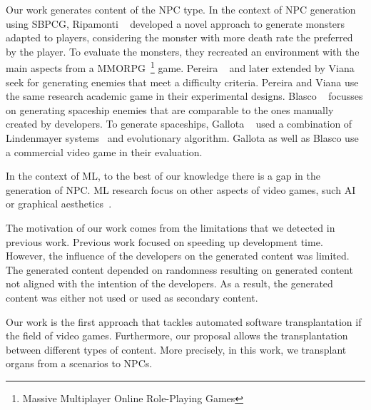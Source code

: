 Our work generates content of the NPC type. In the context of NPC generation using SBPCG, Ripamonti \etal~\cite{ripamonti2021dragon} developed a novel approach to generate monsters adapted to players, considering the monster with more death rate the preferred by the player. To evaluate the monsters, they recreated an environment with the main aspects from a MMORPG~\footnote{Massive Multiplayer Online Role-Playing Games} game. Pereira \etal~\cite{pereira2021procedural_enemies} and later extended by Viana \etal~\cite{viana2022illuminating} seek for generating enemies that meet a difficulty criteria. Pereira \etal and Viana \etal use the same research academic game in their experimental designs. 
Blasco \etal~\cite{blasco2021evolutionary} focusses on generating spaceship enemies that are comparable to the ones manually created by developers. To generate spaceships, Gallota \etal~\cite{gallotta2022evolving} used a combination of Lindenmayer systems~\cite{lindenmayer1968mathematical} and evolutionary algorithm. Gallota \etal as well as Blasco \etal use a commercial video game in their evaluation.

In the context of ML, to the best of our knowledge there is a gap in the generation of NPC. ML research focus on other aspects of video games, such AI~\cite{brocchini2022monster} or graphical aesthetics~\cite{li2020automatic}.

The motivation of our work comes from the limitations that we detected in previous work. Previous work focused on speeding up development time. However, the influence of the developers on the generated content was limited. The generated content depended on randomness resulting on generated content not aligned with the intention of the developers. As a result, the generated content was either not used or used as secondary content. 

Our work is the first approach that tackles automated software transplantation if the field of video games. Furthermore, our proposal allows the transplantation between different types of content. More precisely, in this work, we transplant organs from a scenarios to NPCs.


